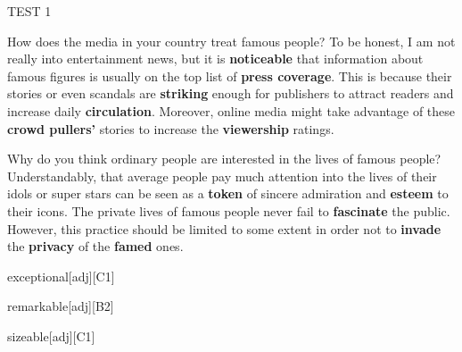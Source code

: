 \begin{glossarymc}[Cambridge 5]
\begin{test}{TEST 1}
    \begin{qa}{How does the media in your country treat famous people?}
    To be honest, I am not really into entertainment news, but it is \textbf{noticeable} that information about famous figures is usually on the top list of \textbf{press coverage}. This is because their stories or even scandals are \textbf{striking} enough for publishers to attract readers and increase daily \textbf{circulation}. Moreover, online media might take advantage of these \textbf{crowd pullers’} stories to increase the \textbf{viewership} ratings.
    \end{qa}

    \begin{qa}{Why do you think ordinary people are interested in the lives of famous people?}
    Understandably, that average people pay much attention into the lives of their idols or super stars can be seen as a \textbf{token} of sincere admiration and \textbf{esteem} to their icons. The private lives of famous people never fail to \textbf{fascinate} the public. However, this practice should be limited to some extent in order not to \textbf{invade} the \textbf{privacy} of the \textbf{famed} ones.
    \end{qa}

    \begin{VocabExplain}[Part 3]
        \begin{ExplainCard}{exceptional}[adj][C1]
        \end{ExplainCard}

        \begin{ExplainCard}{remarkable}[adj][B2]
        \end{ExplainCard}

        \begin{ExplainCard}{sizeable}[adj][C1]
        \end{ExplainCard}


\end{VocabExplain}
\end{test}
\end{glossarymc}
